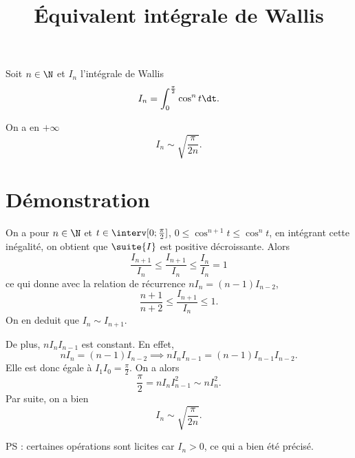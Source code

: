 \documentclass[fontsize=12pt,twoside=false,parskip=half, french]{scrartcl}
\title{Équivalent intégrale de Wallis}
\date{}
\author{}
\begin{document}
\maketitle
   Soit $n \in \N$ et $I_n$ l’intégrale de Wallis
   \[
      I_n = \int_0^{\frac{\pi}{2}} \cos^n t \dt.
   \]
   \begin{Theoreme}
      On a en $+\infty$
      \[
         I_n \sim \sqrt{\frac{\pi}{2n}}.
      \]
   \end{Theoreme}
   \section{Démonstration}
      On a pour $n \in \N$ et $t \in \interv[0; \frac{\pi}{2}]$, 
      $0 \leq \cos^{n + 1} t \leq \cos^{n} t$, en intégrant cette inégalité, 
      on obtient que $\suite{I}$ est positive décroissante. Alors
      \[
         \frac{I_{n + 1}}{I_n} \leq \frac{I_{n + 1}}{I_n} \leq \frac{I_n}{I_n} = 1
      \]
      ce qui donne avec la relation de récurrence $nI_n = (n - 1)I_{n - 2}$,
      \[
         \frac{n + 1}{n + 2} \leq \frac{I_{n + 1}}{I_n} \leq 1.
      \]
      On en deduit que $I_n \sim I_{n + 1}$.
      
      De plus, $nI_nI_{n - 1}$ est constant. En effet, 
      \[
         nI_n = (n - 1)I_{n - 2} \implies nI_nI_{n - 1} = (n - 1)I_{n - 1}I_{n - 2}. 
      \]
      Elle est donc égale à $I_1I_0 = \frac{\pi}{2}$. On a alors
      \[
         \frac{\pi}{2} = nI_nI_{n - 1}^2 \sim nI_n^2. 
      \]
      Par suite, on a bien 
      \[
         I_n \sim \sqrt{\frac{\pi}{2n}}.
      \]
      
      PS : certaines opérations sont licites car $I_n > 0$, ce qui a bien été précisé.
\end{document}
